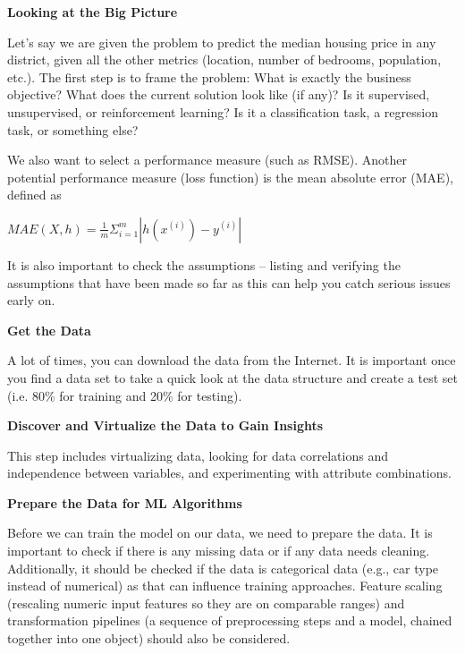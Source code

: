 {\newpage
\textbf{Looking at the Big Picture}
\vspace{11pt}

Let's say we are given the problem to predict the median housing price in any district, given all the other metrics (location, number of bedrooms, population, etc.). The first step is to frame the problem: What is exactly the business objective? What does the current solution look like (if any)? Is it supervised, unsupervised, or reinforcement learning? Is it a classification task, a regression task, or something else?

We also want to select a performance measure (such as RMSE). Another potential performance measure (loss function) is the mean absolute error (MAE), defined as

\vspace{11pt}
\begin{center}
    $MAE(X,h) = \frac1m\Sigma_{i=1}^m|h(x^{(i)})-y^{(i)}|$
\end{center}
\vspace{11pt}

It is also important to check the assumptions -- listing and verifying the assumptions that have been made so far as this can help you catch serious issues early on.

\vspace{11pt}
\textbf{Get the Data}
\vspace{11pt}

A lot of times, you can download the data from the Internet. It is important once you find a data set to take a quick look at the data structure and create a test set (i.e. 80\% for training and 20\% for testing).

\vspace{11pt}
\textbf{Discover and Virtualize the Data to Gain Insights}
\vspace{11pt}

This step includes virtualizing data, looking for data correlations and independence between variables, and experimenting with attribute combinations.


\vspace{11pt}
\textbf{Prepare the Data for ML Algorithms}
\vspace{11pt}

Before we can train the model on our data, we need to prepare the data. It is important to check if there is any missing data or if any data needs cleaning. Additionally, it should be checked if the data is categorical data (e.g., car type instead of numerical) as that can influence training approaches. Feature scaling (rescaling numeric input features so they are on comparable ranges) and transformation pipelines (a sequence of preprocessing steps and a model, chained together into one object) should also be considered.

}

